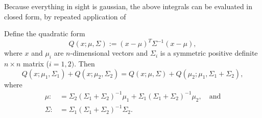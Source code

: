 \documentclass[12pt,leqno]{article}
\begin{document}
Because everything in sight is gaussian, the above integrals can be evaluated in closed form, by repeated application of
\begin{Lem}\label{comp_sq:1}
 Define the quadratic form
  $$
 Q(x;\mu,\Sigma) := (x-\mu)^T\Sigma^{-1}(x-\mu),
  $$
  where $x$ and $\mu_i$ are $n$-dimensional vectors and $\Sigma_i$ is a symmetric positive definite $n\times{n}$
  matrix ($i = 1,2)$. Then
  $$
  Q(x;\mu_1,\Sigma_1)+Q(x;\mu_2,\Sigma_2) = Q(x;\mu,\Sigma) + Q(\mu_2;\mu_1,\Sigma_1+\Sigma_2),
  $$
  where
  \begin{align}
    \mu :&= \Sigma_2(\Sigma_1+\Sigma_2)^{-1}\mu_1+\Sigma_1(\Sigma_1+\Sigma_2)^{-1}\mu_2,\quad\text{and}\label{mu}\\
    \Sigma :&= \Sigma_1(\Sigma_1 + \Sigma_2)^{-1}\Sigma_2\label{sigma}.
  \end{align}
\end{Lem}
\end{document}
